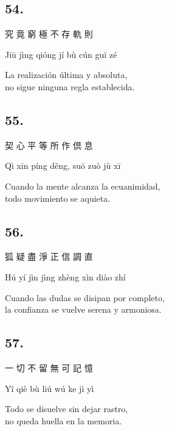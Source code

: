 \documentclass[
  a5paperpaper,
]{article}
\begin{document}
\begin{verseblock}

\hypertarget{section-128}{%
\subsection{54.}\label{section-128}}

究 竟 窮 極 不 存 軌 則

Jiū jìng qióng jí bù cún guĭ zé

La realización última y absoluta,\\
no sigue ninguna regla establecida.

\end{verseblock}

\begin{verseblock}

\hypertarget{section-129}{%
\subsection{55.}\label{section-129}}

契 心 平 等 所 作 倶 息

Qì xīn píng děng, suŏ zuò jù xī

Cuando la mente alcanza la ecuanimidad,\\
todo movimiento se aquieta.

\end{verseblock}

\begin{verseblock}

\hypertarget{section-130}{%
\subsection{56.}\label{section-130}}

狐 疑 盡 淨 正 信 調 直

Hú yí jìn jìng zhèng xìn diào zhí

Cuando las dudas se disipan por completo,\\
la confianza se vuelve serena y armoniosa.

\end{verseblock}

\begin{verseblock}

\hypertarget{section-131}{%
\subsection{57.}\label{section-131}}

一 切 不 留 無 可 記 憶

Yî qiè bù liú wú ke jì yì

Todo se disuelve sin dejar rastro,\\
no queda huella en la memoria.

\end{verseblock}
\end{document}
